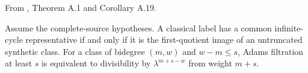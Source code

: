 \begin{theorem}
\label{sem:Literature:complete-permanent-lifts}
From \cite{BHS}, Theorem A.1 and Corollary A.19.\par

Assume the complete-source hypotheses. A classical label has a common infinite-cycle representative if and only if it is the first-quotient image of an untruncated synthetic class. For a class of bidegree $(m,w)$ and $w-m\le s$, Adams filtration at least $s$ is equivalent to divisibility by $\lambda^{m+s-w}$ from weight $m+s$.
\end{theorem}

